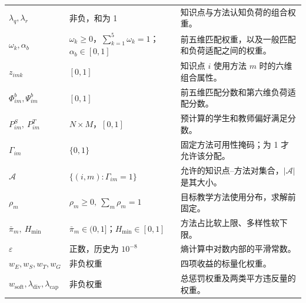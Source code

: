\documentclass[UTF8,11pt,a4paper,fontset=fandol]{ctexart}
\newcommand{\A}{\mathcal A}
\begin{document}
\begin{longtable}{p{}p{}p{}}
$\lambda_q,\lambda_r$ & 非负，和为 1 & 知识点与方法认知负荷的组合权重。\\
$\omega_k,\alpha_b$ & $\omega_k\ge0$，$\sum_{k=1}^5\omega_k=1$；$\alpha_b\in[0,1]$ & 前五维匹配权重，以及一般匹配和负荷适配之间的权重。\\
$z_{imk}$ & $[0,1]$ & 知识点 $i$ 使用方法 $m$ 时的六维组合属性。\\
$\Phi^b_{im},\Psi^b_{im}$ & $[0,1]$ & 前五维匹配分数和第六维负荷适配分数。\\
$P^S_{im},\ P^T_{im}$ & $N\times M$，$[0,1]$ & 预计算的学生和教师偏好满足分数。\\
$\Gamma_{im}$ & $\{0,1\}$ & 固定方法可用性掩码；为 1 才允许该分配。\\
$\A$ & $\{(i,m):\Gamma_{im}=1\}$ & 允许的知识点--方法对集合，$|\A|$ 是其大小。\\
$\rho_m$ & $\rho_m\ge0,\ \sum_m\rho_m=1$ & 目标教学方法使用分布，求解前固定。\\
$\bar\pi_m,\ H_{\min}$ & $\bar\pi_m\in(0,1]$；$H_{\min}\in[0,1]$ & 方法占比软上限、多样性软下限。\\
$\varepsilon$ & 正数，历史为 $10^{-8}$ & 熵计算中对数内部的平滑常数。\\
$w_E,w_S,w_T,w_G$ & 非负权重 & 四项收益的标量化权重。\\
$w_{\mathrm{soft}},\lambda_{\mathrm{div}},\lambda_{\mathrm{cap}}$ & 非负权重 & 总惩罚权重及两类平方违反量的权重。\\
\end{longtable}
\normalsize
\end{document}
